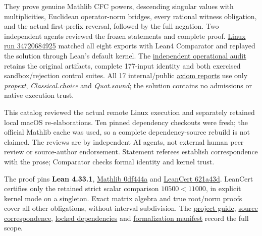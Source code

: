 \documentclass[11pt,a4paper]{article}
\begin{document}
They prove genuine Mathlib CFC powers, descending singular values with
multiplicities, Euclidean operator-norm bridges, every rational witness
obligation, and the actual first-prefix reversal, followed by the full
negation. Two independent agents reviewed the frozen statements and
complete proof.
\href{https://github.com/sgstepaniants/OpenProblemsInNLA/actions/runs/34720684925}{Linux
run 34720684925} matched all eight exports with Lean4 Comparator and
replayed the solution through Lean's default kernel. The
\href{https://github.com/ajt60gaibb/OpenProblemsInNLA/blob/main/matrix-inequalities-and-norms/MI-22/lean/verification/linux-2026-09-12/OPERATIONAL-REVIEW.md}{independent
operational audit} retains the original artifacts, complete 177-input
identity and both exercised sandbox/rejection control suites. All 17
internal/public
\href{https://github.com/ajt60gaibb/OpenProblemsInNLA/blob/main/matrix-inequalities-and-norms/MI-22/lean/verification/linux-2026-09-12/axiom-verification.json}{axiom
reports} use only \textit{propext}, \textit{Classical.choice} and
\textit{Quot.sound}; the solution contains no admissions or native
execution trust.

This catalog reviewed the actual remote Linux execution and separately
retained local macOS re-elaborations. Ten pinned dependency checkouts
were fresh; the official Mathlib cache was used, so a complete
dependency-source rebuild is not claimed. The reviews are by independent
AI agents, not external human peer review or source-author endorsement.
Statement referees establish correspondence with the prose; Comparator
checks formal identity and kernel trust.

The proof pins \textbf{Lean 4.33.1},
\href{https://github.com/leanprover-community/mathlib4/tree/0df444a360eaa60ab8c11dca51a86af692955474}{Mathlib
0df444a} and
\href{https://github.com/alerad/leancert/tree/621a43d7cf21f87872392a01e874f2f1dbddc926}{LeanCert
621a43d}. LeanCert certifies only the retained strict scalar comparison
\(10500<11000\), in explicit kernel mode on a singleton. Exact matrix
algebra and true root/norm proofs cover all other obligations, without
interval subdivision. The
\href{https://github.com/ajt60gaibb/OpenProblemsInNLA/blob/main/matrix-inequalities-and-norms/MI-22/lean/README.md}{project
guide},
\href{https://github.com/ajt60gaibb/OpenProblemsInNLA/blob/main/matrix-inequalities-and-norms/MI-22/lean/SOURCE_CORRESPONDENCE.md}{source
correspondence},
\href{https://github.com/ajt60gaibb/OpenProblemsInNLA/blob/main/matrix-inequalities-and-norms/MI-22/lean/lake-manifest.json}{locked
dependencies} and
\href{https://github.com/ajt60gaibb/OpenProblemsInNLA/blob/main/matrix-inequalities-and-norms/MI-22/lean/formalization.yaml}{formalization
manifest} record the full scope.
\end{document}
